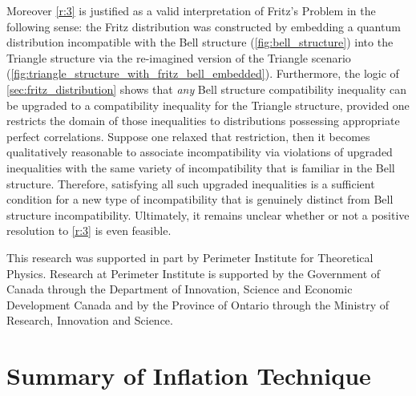 \documentclass[aps, 10pt, english, twoside, pra, nofootinbib, tightenlines, longbibliography, superscriptaddress]{revtex4-1}
\begin{document}
    Moreover \ref{r:3} is justified as a valid interpretation of Fritz's Problem in the following sense: the Fritz distribution was constructed by embedding a quantum distribution incompatible with the Bell structure (\cref{fig:bell_structure}) into the Triangle structure via the re-imagined version of the Triangle scenario (\cref{fig:triangle_structure_with_fritz_bell_embedded}). Furthermore, the logic of \cref{sec:fritz_distribution} shows that \textit{any} Bell structure compatibility inequality can be upgraded to a compatibility inequality for the Triangle structure, provided one restricts the domain of those inequalities to distributions possessing appropriate perfect correlations. Suppose one relaxed that restriction, then it becomes qualitatively reasonable to associate incompatibility via violations of upgraded inequalities with the same variety of incompatibility that is familiar in the Bell structure. Therefore, satisfying all such upgraded inequalities is a sufficient condition for a new type of incompatibility that is genuinely distinct from Bell structure incompatibility. Ultimately, it remains unclear whether or not a positive resolution to \ref{r:3} is even feasible.


    \begin{acknowledgments}
    This research was supported in part by Perimeter Institute for Theoretical Physics. Research at Perimeter Institute is supported by the Government of Canada through the Department of Innovation, Science and Economic Development Canada and by the Province of Ontario through the Ministry of Research, Innovation and Science.
    \end{acknowledgments}

    \appendix

    \section{Summary of Inflation Technique}
    \label{sec:inflation_technique}

\end{document}
